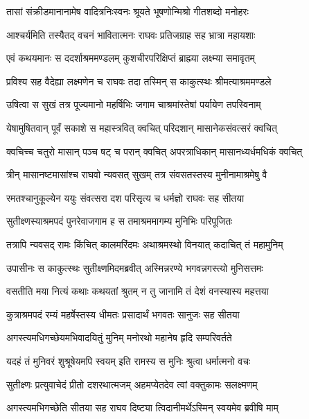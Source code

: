 \twolineshloka
{तासां संक्रीडमानानामेष वादित्रनिःस्वनः}
{श्रूयते भूषणोन्मिश्रो गीतशब्दो मनोहरः} %

\twolineshloka
{आश्चर्यमिति तस्यैतद् वचनं भावितात्मनः}
{राघवः प्रतिजग्राह सह भ्रात्रा महायशाः} %

\twolineshloka
{एवं कथयमानः स ददर्शाश्रममण्डलम्}
{कुशचीरपरिक्षिप्तं ब्राह्म्या लक्ष्म्या समावृतम्} %

\twolineshloka
{प्रविश्य सह वैदेह्या लक्ष्मणेन च राघवः}
{तदा तस्मिन् स काकुत्स्थः श्रीमत्याश्रममण्डले} %

\twolineshloka
{उषित्वा स सुखं तत्र पूज्यमानो महर्षिभिः}
{जगाम चाश्रमांस्तेषां पर्यायेण तपस्विनाम्} %

\twolineshloka
{येषामुषितवान् पूर्वं सकाशे स महास्त्रवित्}
{क्वचित् परिदशान् मासानेकसंवत्सरं क्वचित्} %

\twolineshloka
{क्वचिच्च चतुरो मासान् पञ्च षट् च परान् क्वचित्}
{अपरत्राधिकान् मासानध्यर्धमधिकं क्वचित्} %

\twolineshloka
{त्रीन् मासानष्टमासांश्च राघवो न्यवसत् सुखम्}
{तत्र संवसतस्तस्य मुनीनामाश्रमेषु वै} %

\twolineshloka
{रमतश्चानुकूल्येन ययुः संवत्सरा दश}
{परिसृत्य च धर्मज्ञो राघवः सह सीतया} %

\twolineshloka
{सुतीक्ष्णस्याश्रमपदं पुनरेवाजगाम ह}
{स तमाश्रममागम्य मुनिभिः परिपूजितः} %

\twolineshloka
{तत्रापि न्यवसद् रामः किंचित् कालमरिंदमः}
{अथाश्रमस्थो विनयात् कदाचित् तं महामुनिम्} %

\twolineshloka
{उपासीनः स काकुत्स्थः सुतीक्ष्णमिदमब्रवीत्}
{अस्मिन्नरण्ये भगवन्नगस्त्यो मुनिसत्तमः} %

\twolineshloka
{वसतीति मया नित्यं कथाः कथयतां श्रुतम्}
{न तु जानामि तं देशं वनस्यास्य महत्तया} %

\twolineshloka
{कुत्राश्रमपदं रम्यं महर्षेस्तस्य धीमतः}
{प्रसादार्थं भगवतः सानुजः सह सीतया} %

\twolineshloka
{अगस्त्यमधिगच्छेयमभिवादयितुं मुनिम्}
{मनोरथो महानेष हृदि सम्परिवर्तते} %

\twolineshloka
{यदहं तं मुनिवरं शुश्रूषेयमपि स्वयम्}
{इति रामस्य स मुनिः श्रुत्वा धर्मात्मनो वचः} %

\twolineshloka
{सुतीक्ष्णः प्रत्युवाचेदं प्रीतो दशरथात्मजम्}
{अहमप्येतदेव त्वां वक्तुकामः सलक्ष्मणम्} %

\twolineshloka
{अगस्त्यमभिगच्छेति सीतया सह राघव}
{दिष्ट्या त्विदानीमर्थेऽस्मिन् स्वयमेव ब्रवीषि माम्} %

